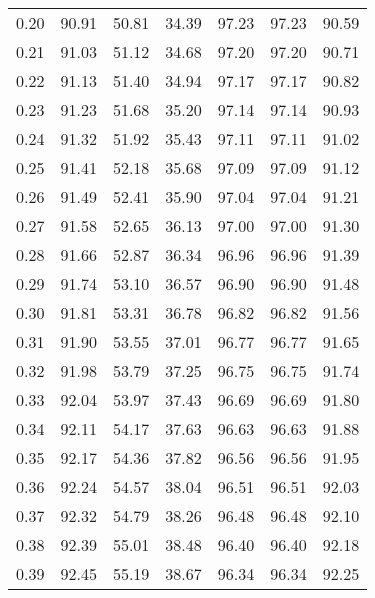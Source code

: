 \begin{tabular}{|c|c|c|c|c|c|c|}
      0.20 &     90.91 &     50.81 &      34.39 &   97.23 &      97.23 &         90.59 \\
      0.21 &     91.03 &     51.12 &      34.68 &   97.20 &      97.20 &         90.71 \\
      0.22 &     91.13 &     51.40 &      34.94 &   97.17 &      97.17 &         90.82 \\
      0.23 &     91.23 &     51.68 &      35.20 &   97.14 &      97.14 &         90.93 \\
      0.24 &     91.32 &     51.92 &      35.43 &   97.11 &      97.11 &         91.02 \\
      0.25 &     91.41 &     52.18 &      35.68 &   97.09 &      97.09 &         91.12 \\
      0.26 &     91.49 &     52.41 &      35.90 &   97.04 &      97.04 &         91.21 \\
      0.27 &     91.58 &     52.65 &      36.13 &   97.00 &      97.00 &         91.30 \\
      0.28 &     91.66 &     52.87 &      36.34 &   96.96 &      96.96 &         91.39 \\
      0.29 &     91.74 &     53.10 &      36.57 &   96.90 &      96.90 &         91.48 \\
      0.30 &     91.81 &     53.31 &      36.78 &   96.82 &      96.82 &         91.56 \\
      0.31 &     91.90 &     53.55 &      37.01 &   96.77 &      96.77 &         91.65 \\
      0.32 &     91.98 &     53.79 &      37.25 &   96.75 &      96.75 &         91.74 \\
      0.33 &     92.04 &     53.97 &      37.43 &   96.69 &      96.69 &         91.80 \\
      0.34 &     92.11 &     54.17 &      37.63 &   96.63 &      96.63 &         91.88 \\
      0.35 &     92.17 &     54.36 &      37.82 &   96.56 &      96.56 &         91.95 \\
      0.36 &     92.24 &     54.57 &      38.04 &   96.51 &      96.51 &         92.03 \\
      0.37 &     92.32 &     54.79 &      38.26 &   96.48 &      96.48 &         92.10 \\
      0.38 &     92.39 &     55.01 &      38.48 &   96.40 &      96.40 &         92.18 \\
      0.39 &     92.45 &     55.19 &      38.67 &   96.34 &      96.34 &         92.25 \\

\end{tabular}
